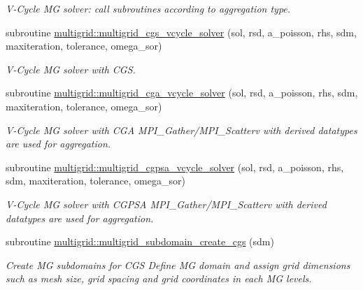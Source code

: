 \begin{DoxyCompactItemize}
\begin{DoxyCompactList}\small\item\em V-\/\+Cycle MG solver\+: call subroutines according to aggregation type. \end{DoxyCompactList}\item 
subroutine \hyperlink{namespacemultigrid_aa8278baf0276649fe656c1b8f7dba30a}{multigrid\+::multigrid\+\_\+cgs\+\_\+vcycle\+\_\+solver} (sol, rsd, a\+\_\+poisson, rhs, sdm, maxiteration, tolerance, omega\+\_\+sor)
\begin{DoxyCompactList}\small\item\em V-\/\+Cycle MG solver with C\+GS. \end{DoxyCompactList}\item 
subroutine \hyperlink{namespacemultigrid_a4295ca0af002ede1dee98750922f1f60}{multigrid\+::multigrid\+\_\+cga\+\_\+vcycle\+\_\+solver} (sol, rsd, a\+\_\+poisson, rhs, sdm, maxiteration, tolerance, omega\+\_\+sor)
\begin{DoxyCompactList}\small\item\em V-\/\+Cycle MG solver with C\+GA  M\+P\+I\+\_\+\+Gather/\+M\+P\+I\+\_\+\+Scatterv with derived datatypes are used for aggregation. \end{DoxyCompactList}\item 
subroutine \hyperlink{namespacemultigrid_ae89565627880985244634750502edab5}{multigrid\+::multigrid\+\_\+cgpsa\+\_\+vcycle\+\_\+solver} (sol, rsd, a\+\_\+poisson, rhs, sdm, maxiteration, tolerance, omega\+\_\+sor)
\begin{DoxyCompactList}\small\item\em V-\/\+Cycle MG solver with C\+G\+P\+SA  M\+P\+I\+\_\+\+Gather/\+M\+P\+I\+\_\+\+Scatterv with derived datatypes are used for aggregation. \end{DoxyCompactList}\end{DoxyCompactItemize}
\textbf{ }\par
\begin{DoxyCompactItemize}
\item 
subroutine \hyperlink{namespacemultigrid_acb52ce247bf637e69274d8da44d1f159}{multigrid\+::multigrid\+\_\+subdomain\+\_\+create\+\_\+cgs} (sdm)
\begin{DoxyCompactList}\small\item\em Create MG subdomains for C\+GS  Define MG domain and assign grid dimensions such as mesh size, grid spacing and grid coordinates in each MG levels. \end{DoxyCompactList}\end{DoxyCompactItemize}


